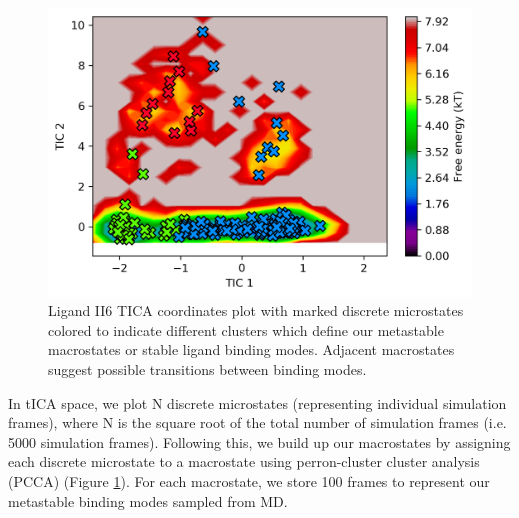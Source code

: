 \begin{figure}
    \centering
    \includegraphics{chapter5/II6/II6_1-full-tiCA-PCCA.png}
    \caption[PCCA Analysis of Ligand II6]{Ligand II6 TICA coordinates plot with marked discrete microstates colored to indicate different clusters which define our metastable macrostates or stable ligand binding modes. Adjacent macrostates suggest possible transitions between binding modes.}
    \label{fig:II6_1-TICA-PCCA}
\end{figure}

In tICA space, we plot N discrete microstates (representing individual simulation frames), where N is the square root of the total number of simulation frames (i.e. 5000 simulation frames). 
Following this, we build up our macrostates by assigning each discrete microstate to a macrostate using perron-cluster cluster analysis (PCCA) \cite{roblitz_fuzzy_2013,deuflhard_robust_2005} (Figure \ref{fig:II6_1-TICA-PCCA}).
For each macrostate, we store 100 frames to represent our metastable binding modes sampled from MD.


